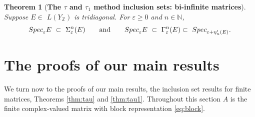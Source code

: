 \documentclass[preprint,1p,11pt]{elsarticle}
\newcommand\N{{\mathbb N}}
\newcommand\Z{{\mathbb Z}}
\newcommand\eps{{\varepsilon}}
\newcommand\Specn{{\rm Spec}}   %
\newcommand\Speps{{\rm Spec}_\eps}
\newtheorem{theorem}{Theorem}[section]
\numberwithin{equation}{section}   %
\numberwithin{figure}{section}  %
\begin{document}
\begin{theorem}[\bf The $\tau$ and $\tau_1$ method inclusion sets: bi-infinite matrices] \label{thm:taubi} Suppose $E\in$
$L(Y_\Z)$ is tridiagonal. For $\eps\geq 0$ and $n\in \N$,
$$
\Speps E\ \subset\ \Sigma^n_\eps(E) \qquad \mbox{and} \qquad \Speps E\ \subset\ \Gamma^n_\eps(E) \subset\ \Specn_{\eps+\eta'_n(E)}.
$$
\end{theorem}
 



\section{The proofs of our main results} \label{sec:main}
We turn now to the proofs of our main results, the inclusion set results for finite matrices, Theorems \ref{thm:tau} and \ref{thm:tau1}. Throughout this section $A$ is the finite complex-valued matrix with block representation \eqref{eq:block}.
\end{document}
